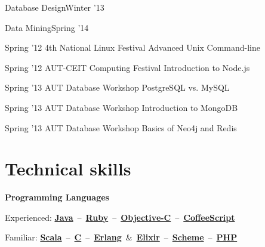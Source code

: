 \documentclass{tccv}
\begin{document}
{{\begin{ta}
\item{Database Design}{Winter '13}

\item{Data Mining}{Spring '14}

\end{ta}



\vspace{15pt}


\begin{presenter}

\item{Spring '12}
	 {4th National Linux Festival}
	 {Advanced Unix Command-line}

\item{Spring '12}
	 {AUT-CEIT Computing Festival}
	 {Introduction to Node.js}


\item{Spring '13}
	 {AUT Database Workshop}
	 {PostgreSQL vs. MySQL}

\item{Spring '13}
	 {AUT Database Workshop}
	 {Introduction to MongoDB}

\item{Spring '13}
	 {AUT Database Workshop}
	 {Basics of Neo4j and Redis}
\end{presenter}


\vspace{-15pt}











\section{Technical skills}


\textsf{\textbf{Programming Languages}}
	 
\hspace{3pt}%
Experienced:
\mbox{\href{http://www.oracle.com/technetwork/java/}{\bf Java} -- %
     \href{https://www.ruby-lang.org/en/}{\bf Ruby} -- %
     \href{https://en.wikipedia.org/wiki/Objective-C}{\bf Objective-C} -- %
     \href{http://coffeescript.org}{\bf CoffeeScript}%
}

\hspace{3pt}%
Familiar:
\mbox{\href{http://www.scala-lang.org}{\bf Scala} -- %
     \href{https://en.wikipedia.org/wiki/C_(programming_language)}{\bf C} -- %
     \href{http://www.erlang.org}{\bf Erlang} \& %
     \href{http://elixir-lang.org}{\bf Elixir} --  %
     \href{http://schemers.org}{\bf Scheme} -- %
     \href{http://php.net}{\bf PHP}%
}



}}
\end{document}
